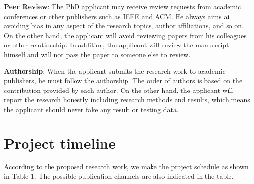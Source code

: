 \documentclass{article}
\numberwithin{equation}{section}
\begin{document}
\textbf{Peer Review}: The PhD applicant may receive review requests from academic conferences or other publishers such as IEEE and ACM. He always aims at avoiding bias in any aspect of the research topics, author affiliations, and so on. On the other hand, the applicant will avoid reviewing papers from his colleagues or other relationship. In addition, the applicant will review the manuscript himself and will not pass the paper to someone else to review.

\textbf{Authorship}: When the applicant submits the research work to academic publishers, he must follow the authorship. The order of authors is based on the contribution provided by each author. On the other hand, the applicant will report the research honestly including research methods and results, which means the applicant should never fake any result or testing data.

\section{Project timeline}
According to the proposed research work, we make the project schedule as shown in Table 1. The possible publication channels are also indicated in the table. \\
\end{document}
